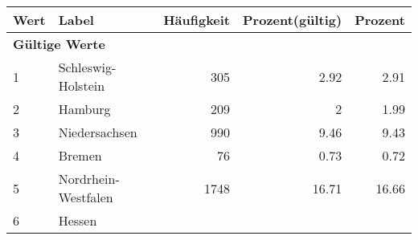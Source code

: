      \begin{longtable}{lXrrr}
     \toprule
     \textbf{Wert} & \textbf{Label} & \textbf{Häufigkeit} & \textbf{Prozent(gültig)} & \textbf{Prozent} \\
     \endhead
     \midrule
     \multicolumn{5}{l}{\textbf{Gültige Werte}}\\

     1 &
     \multicolumn{1}{X}{ Schleswig-Holstein   } &


       \num{305} &
       \num[round-mode=places,round-precision=2]{2.92} &
         \num[round-mode=places,round-precision=2]{2.91} \\

     2 &
     \multicolumn{1}{X}{ Hamburg   } &


       \num{209} &
       \num[round-mode=places,round-precision=2]{2} &
         \num[round-mode=places,round-precision=2]{1.99} \\

     3 &
     \multicolumn{1}{X}{ Niedersachsen   } &


       \num{990} &
       \num[round-mode=places,round-precision=2]{9.46} &
         \num[round-mode=places,round-precision=2]{9.43} \\

     4 &
     \multicolumn{1}{X}{ Bremen   } &


       \num{76} &
       \num[round-mode=places,round-precision=2]{0.73} &
         \num[round-mode=places,round-precision=2]{0.72} \\

     5 &
     \multicolumn{1}{X}{ Nordrhein-Westfalen   } &


       \num{1748} &
       \num[round-mode=places,round-precision=2]{16.71} &
         \num[round-mode=places,round-precision=2]{16.66} \\

     6 &
     \multicolumn{1}{X}{ Hessen   } &



\end{longtable}
